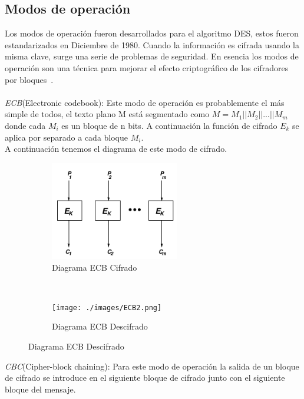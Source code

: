 \subsection{Modos de operación}
Los modos de operaci\'on fueron desarrollados para el algoritmo DES, estos fueron estandarizados en Diciembre de 1980. 
Cuando la informaci\'on es cifrada usando la misma clave, surge una serie de problemas de seguridad. En esencia los modos de operaci\'on son una técnica para mejorar el efecto criptogr\'afico de los 
cifradores por bloques~\cite{modes}.\\\\
\textit{ECB}(Electronic codebook): Este modo de operación es probablemente el más simple de todos, el texto plano M está segmentado como $ M=M_1||M_2||...||M_m$ donde cada $M_i$ es un bloque de n bits. A continuación la funci\'on de cifrado $E_k$ se aplica por separado a cada bloque $M_i$. \\
A continuación tenemos el diagrama de este modo de cifrado.\\
\begin{figure}[h]
    \centering
    \begin{subfigure}[t]{0.5\textwidth}
        \centering
        \includegraphics[height=1.7in]{./images/ecb1.png}
        \caption{Diagrama ECB Cifrado}
        \label{fig:1-3-1}
    \end{subfigure}%
    ~ 
    \begin{subfigure}[t]{0.5\textwidth}
        \centering
        \texttt{[image: ./images/ECB2.png]}
        \caption{Diagrama ECB Descifrado}
        \label{fig:1-3-1}
    \end{subfigure}
    \label{fig:protocol}
\end{figure}


\textit{CBC}(Cipher-block chaining): Para este modo de operación la salida de un bloque de cifrado se introduce en el siguiente bloque de cifrado junto con el siguiente bloque del mensaje.\\

